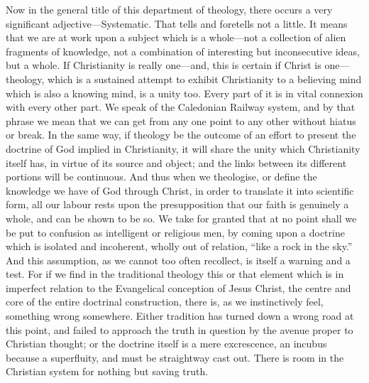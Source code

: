 \documentclass[12pt,a5paper]{article}
\begin{document}
Now in the general title of this department of theology,
there occurs a very significant adjective---Systematic. That
tells and foretells not a little. It means that we are at
work upon a subject which is a whole---not a collection of
alien fragments of knowledge, not a combination of interesting
but inconsecutive ideas, but a whole. If Christianity
is really one---and, this is certain if Christ is one---theology,
which is a sustained attempt to exhibit Christianity
to a believing mind which is also a knowing mind, 
is a unity too. Every part of it is in vital connexion with
every other part. We speak of the Caledonian Railway
system, and by that phrase we mean that we can get from
any one point to any other without hiatus or break. In the
same way, if theology be the outcome of an effort to present
the doctrine of God implied in Christianity, it will share
the unity which Christianity itself has, in virtue of its
source and object; and the links between its different
portions will be continuous. And thus when we theologise,
or define the knowledge we have of God through Christ, in
order to translate it into scientific form, all our labour rests
upon the presupposition that our faith is genuinely a
whole, and can be shown to be so. We take for granted
that at no point shall we be put to confusion as intelligent
or religious men, by coming upon a doctrine which is isolated
and incoherent, wholly out of relation, ``like a rock in the
sky.'' And this assumption, as we cannot too often
recollect, is itself a warning and a test. For if we find in
the traditional theology this or that element which is in
imperfect relation to the Evangelical conception of Jesus
Christ, the centre and core of the entire doctrinal construction,
there is, as we instinctively feel, something wrong
somewhere. Either tradition has turned down a wrong
road at this point, and failed to approach the truth in
question by the avenue proper to Christian thought; or the
doctrine itself is a mere excrescence, an incubus because a
superfluity, and must be straightway cast out. There is
room in the Christian system for nothing but saving truth.
\end{document}
